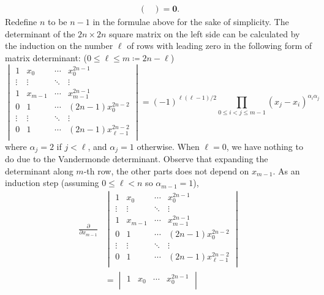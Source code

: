 \documentclass{homework}
\begin{document}
{\begin{align*}
\begin{pmatrix}
    \end{pmatrix}
    = \mathbf 0.
\end{align*}
Redefine $n$ to be $n-1$ in the formulae above for the sake of simplicity. The determinant of the $2n\times 2n$ square matrix on the left side can be calculated by the induction on the number $\ell$ of rows with leading zero in the following form of matrix determinant: ($0\le \ell\le m\coloneqq 2n-\ell$)
\[ \begin{vmatrix}
        1      & x_0     & \cdots & x_0^{2n-1}               \\
        \vdots & \vdots  & \ddots & \vdots                   \\
        1      & x_{m-1} & \cdots & x_{m-1}^{2n-1}           \\
        0      & 1       & \cdots & (2n-1) x_0^{2n-2}        \\
        \vdots & \vdots  & \ddots & \vdots                   \\
        0      & 1       & \cdots & (2n-1) x_{\ell-1}^{2n-2} \\
    \end{vmatrix} =  (-1)^{\ell(\ell-1)/2} \prod_{0\le i<j\le m-1} (x_j-x_i)^{\alpha_i\alpha_j} \]
where $\alpha_j=2$ if $j< \ell$, and $\alpha_j=1$ otherwise.
When $\ell=0$, we have nothing to do due to the Vandermonde determinant. Observe that expanding the determinant along $m$-th row, the other parts does not depend on $x_{m-1}$. As an induction step (assuming $0\le\ell<n$ so $\alpha_{m-1}=1$),
\begin{align*}
    \frac{\partial}{\partial x_{m-1}} & \begin{vmatrix}
        1      & x_0     & \cdots & x_0^{2n-1}               \\
        \vdots & \vdots  & \ddots & \vdots                   \\
        1      & x_{m-1} & \cdots & x_{m-1}^{2n-1}           \\
        0      & 1       & \cdots & (2n-1) x_0^{2n-2}        \\
        \vdots & \vdots  & \ddots & \vdots                   \\
        0      & 1       & \cdots & (2n-1) x_{\ell-1}^{2n-2} \\
    \end{vmatrix}
    \\&= \begin{vmatrix}
        1      & x_0     & \cdots & x_0^{2n-1}               \\

\end{vmatrix}
\end{align*}}
\end{document}
